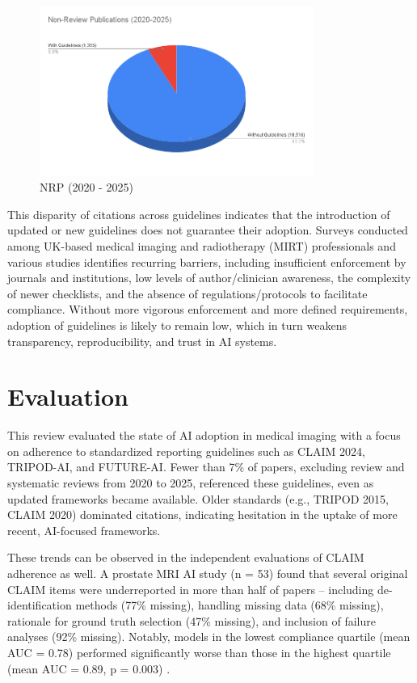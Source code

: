 \documentclass{article}
\begin{document}
\newpage

\begin{figure}[htbp]
    \centering
    \includegraphics[width=0.8\textwidth]{Non-Review Publications (2020-2025).png}
    \caption{NRP (2020 - 2025)}
    \label{fig:nrp2020}
\end{figure}

This disparity of citations across guidelines indicates that the introduction of updated or new guidelines does not guarantee their adoption. Surveys conducted among UK-based medical imaging and radiotherapy (MIRT) professionals \cite{nikolaosstogiannos_2024_black} and various studies \cite{belue_2023_the,burakkoak_2025_adherence} identifies recurring barriers, including insufficient enforcement by journals and institutions, low levels of author/clinician awareness, the complexity of newer checklists, and the absence of regulations/protocols to facilitate compliance. Without more vigorous enforcement and more defined requirements, adoption of guidelines is likely to remain low,  which in turn weakens transparency, reproducibility, and trust in AI systems.

\section{Evaluation}

This review evaluated the state of AI adoption in medical imaging with a focus on adherence to standardized reporting guidelines such as CLAIM 2024, TRIPOD-AI, and FUTURE-AI. Fewer than 7\% of papers, excluding review and systematic reviews from 2020 to 2025, referenced these guidelines, even as updated frameworks became available. Older standards (e.g., TRIPOD 2015, CLAIM 2020) dominated citations, indicating hesitation in the uptake of more recent, AI-focused frameworks.

These trends can be observed in the independent evaluations of CLAIM adherence as well. A prostate MRI AI study (n = 53) found that several original CLAIM items were underreported in more than half of papers -- including de-identification methods (77\% missing), handling missing data (68\% missing), rationale for ground truth selection (47\% missing), and inclusion of failure analyses (92\% missing). Notably, models in the lowest compliance quartile (mean AUC = 0.78) performed significantly worse than those in the highest quartile (mean AUC = 0.89, p = 0.003) \cite{belue_2023_the}.
\end{document}
